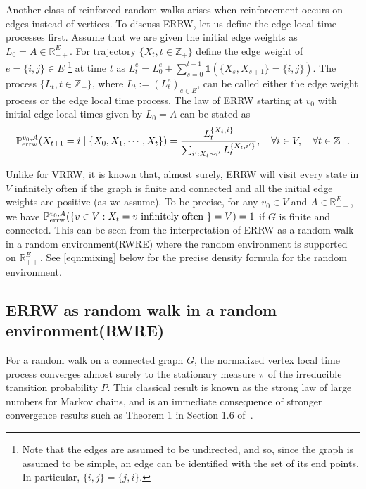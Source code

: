 \documentclass[a4paper, 11pt]{article}
\renewcommand{\P}{\mathbb{P}}
\newcommand{\Perrw}{\P_{\textnormal{errw}}}
\newcommand{\ind}{\mathbf{1}}
\begin{document}
Another class of reinforced random walks arises when reinforcement occurs on edges instead of vertices. To discuss ERRW, let us define the edge local time processes first. Assume that we are given the initial edge weights as $L_0 = A \in \mathbb{R}_{++}^E$. For trajectory $\{X_t, t \in \mathbb{Z}_+\}$ define the edge weight of $e=\{i,j\}\in E$ 
\footnote{Note that the edges are assumed to be undirected, and so, since the graph is assumed to be simple, an edge can be identified with the set of its end points. In particular, $\{i,j\} = \{j,i\}$.}
at time $t$ as $L_t^e = L_0^e+\sum_{s=0}^{t-1}\ind(\{X_s,X_{s+1}\}=\{i,j\})$.
The process 
$\{L_t, t \in \mathbb{Z}_+\}$, where
$L_t:=(L_t^e)_{e\in E}$, can be called either the edge weight process or the edge local time process. The law of ERRW starting at $v_0$ with initial edge local times given by $L_0=A$ can be stated as 
\begin{equation}        \label{eqn:errwlaw}
\Perrw^{v_0,A}(X_{t+1}=i \mid \{X_0,X_1,\cdots, X_t\}) = \frac{L_t^{\{X_t, i\}}}{\sum_{i':X_t \sim i'} L_t^{\{X_t, i'\}}}, \quad \forall i\in V,
\quad \forall t \in \mathbb{Z}_+.
\end{equation}

Unlike for VRRW, it is known that, almost surely, ERRW will visit every state in $V$ infinitely often if the graph is finite and connected and all the initial edge weights are positive (as we assume). To be precise, for any $v_0\in V$ and $A \in \mathbb{R}_{++}^E$, we have $\Perrw^{v_0,A}(\{v\in V: X_t=v\text{ infinitely often }\}=V)=1$ if $G$ is finite and connected. This can be seen from the interpretation of ERRW as a random walk in a random environment(RWRE) where the random environment is supported on $\mathbb{R}_{++}^E$. See \cref{eqn:mixing} below for the precise density formula for the random environment.

\subsection{ERRW as random walk in a random environment(RWRE)}

For 
a random walk
on a connected graph $G$, the normalized vertex local time process 
converges
almost surely to the stationary measure $\pi$ of the irreducible transition probability $P$. This classical result is known as the strong law of large numbers for Markov chains,
and is an immediate consequence of stronger
convergence results such as 
Theorem 1 in Section 1.6 of~\cite{Chung60}.
\end{document}

